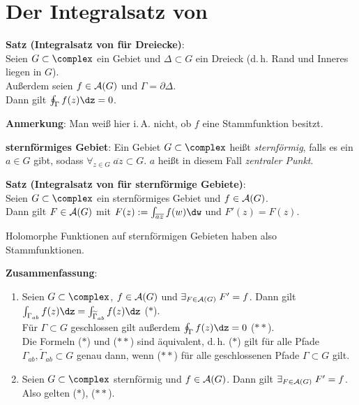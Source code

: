 \section{%
    Der Integralsatz von %
}

\textbf{Satz (Integralsatz von  für Dreiecke)}:\\
Seien $G \subset \complex$ ein Gebiet und $\Delta \subset G$ ein Dreieck
(d.\,h. Rand und Inneres liegen in $G$).\\
Außerdem seien $f \in \mathcal{A}(G)$ und $\Gamma = \partial \Delta$.\\
Dann gilt $\oint_\Gamma f(z)\dz = 0$.

\textbf{Anmerkung}:
Man weiß hier i.\,A. nicht, ob $f$ eine Stammfunktion besitzt.

\linie

\textbf{sternförmiges Gebiet}:
Ein Gebiet $G \subset \complex$ heißt \emph{sternförmig}, falls es ein
$a \in G$ gibt, sodass
$\forall_{z \in G}\; \overline{az} \subset G$.
$a$ heißt in diesem Fall \emph{zentraler Punkt}.

\textbf{Satz (Integralsatz von  für sternförmige Gebiete)}:\\
Seien $G \subset \complex$ ein sternförmiges Gebiet und $f \in \mathcal{A}(G)$.\\
Dann gilt $F \in \mathcal{A}(G)$ mit $F(z) := \int_{\overline{az}} f(w)\dw$ und
$F'(z) = F(z)$.

Holomorphe Funktionen auf sternförmigen Gebieten haben also Stammfunktionen.

\linie

\textbf{Zusammenfassung}:
\begin{enumerate}
    \item
    Seien $G \subset \complex$, $f \in \mathcal{A}(G)$ und
    $\exists_{F \in \mathcal{A}(G)}\; F' = f$.
    Dann gilt $\int_{\Gamma_{ab}} f(z)\dz =
    \int_{\widetilde{\Gamma}_{ab}} f(z)\dz$ ($\ast$).\\
    Für $\Gamma \subset G$ geschlossen gilt außerdem $\oint_\Gamma f(z)\dz = 0$
    ($\ast\ast$).\\
    Die Formeln ($\ast$) und ($\ast\ast$) sind äquivalent, d.\,h.
    ($\ast$) gilt für alle Pfade
    $\Gamma_{ab}, \widetilde{\Gamma}_{ab} \subset G$
    genau dann, wenn ($\ast\ast$) für alle geschlossenen Pfade
    $\Gamma \subset G$ gilt.

    \item
    Seien $G \subset \complex$ sternförmig und $f \in \mathcal{A}(G)$.
    Dann gilt $\exists_{F \in \mathcal{A}(G)}\; F' = f$.
    Also gelten ($\ast$), ($\ast\ast$).
\end{enumerate}

